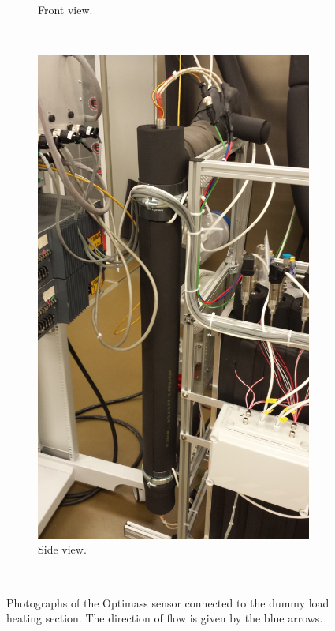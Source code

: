 \documentclass{report}
\begin{document}
\begin{figure}
\begin{subfigure}[b]{0.5\textwidth}
                \caption{Front view.}
  				\label{fig:sensor}
        \end{subfigure}%
        ~
        \begin{subfigure}[b]{0.5\textwidth}
                \includegraphics[width=\textwidth]{heaterCloseUp}
                \caption{Side view.}
  				\label{fig:heaters}
        \end{subfigure}
        ~ %
          \caption{Photographs of the Optimass sensor connected to the dummy load heating section. The direction of flow is given by the blue arrows.}
\end{figure}
\end{document}

